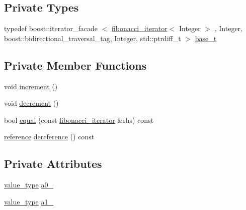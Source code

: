 \subsection*{\-Private \-Types}
\begin{DoxyCompactItemize}
\item 
typedef boost\-::iterator\-\_\-facade\*
$<$ \hyperlink{classyuh_1_1range__detail_1_1fibonacci__iterator}{fibonacci\-\_\-iterator}$<$ \-Integer $>$\*
, \-Integer, \*
boost\-::bidirectional\-\_\-traversal\-\_\-tag, \*
\-Integer, std\-::ptrdiff\-\_\-t $>$ \hyperlink{classyuh_1_1range__detail_1_1fibonacci__iterator_a81abbaeb18ba3b07e8a00e7e8d66979f}{base\-\_\-t}
\end{DoxyCompactItemize}
\subsection*{\-Private \-Member \-Functions}
\begin{DoxyCompactItemize}
\item 
void \hyperlink{classyuh_1_1range__detail_1_1fibonacci__iterator_aeb2624c7a86b765725fd80cd426e147d}{increment} ()
\item 
void \hyperlink{classyuh_1_1range__detail_1_1fibonacci__iterator_af998f1201f6ff5160003144e5818b8ba}{decrement} ()
\item 
bool \hyperlink{classyuh_1_1range__detail_1_1fibonacci__iterator_a93ee330d72c3d94165f81d2f039cbca4}{equal} (const \hyperlink{classyuh_1_1range__detail_1_1fibonacci__iterator}{fibonacci\-\_\-iterator} \&rhs) const 
\item 
\hyperlink{classyuh_1_1range__detail_1_1fibonacci__iterator_aa5d67140d1557795cc6c30a2849d4e05}{reference} \hyperlink{classyuh_1_1range__detail_1_1fibonacci__iterator_a1b739c629ff6d9f19e13216adc65a999}{dereference} () const 
\end{DoxyCompactItemize}
\subsection*{\-Private \-Attributes}
\begin{DoxyCompactItemize}
\item 
\hyperlink{classyuh_1_1range__detail_1_1fibonacci__iterator_ab7468d4ed49b58c84d6c1b71779fb43e}{value\-\_\-type} \hyperlink{classyuh_1_1range__detail_1_1fibonacci__iterator_a188fdb4f867cf1bd468eca769d02e4ba}{a0\-\_\-}
\item 
\hyperlink{classyuh_1_1range__detail_1_1fibonacci__iterator_ab7468d4ed49b58c84d6c1b71779fb43e}{value\-\_\-type} \hyperlink{classyuh_1_1range__detail_1_1fibonacci__iterator_ab72f8fd5789483ff52778966e56e0929}{a1\-\_\-}
\end{DoxyCompactItemize}
